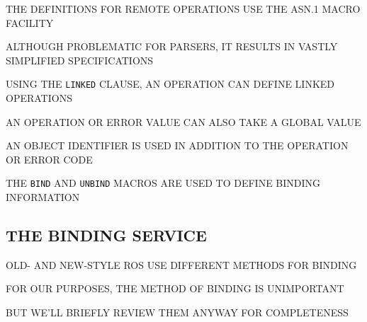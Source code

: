\begin{bwslide}

\begin{nrtc}
\item	THE DEFINITIONS FOR REMOTE OPERATIONS USE THE ASN.1 MACRO FACILITY

\item	ALTHOUGH PROBLEMATIC FOR PARSERS, IT RESULTS IN VASTLY SIMPLIFIED
	SPECIFICATIONS
\end{nrtc}
\end{bwslide}




\begin{bwslide}

\begin{nrtc}
\item	USING THE \verb"LINKED" CLAUSE, AN OPERATION CAN DEFINE LINKED
	OPERATIONS

\item	AN OPERATION OR ERROR VALUE CAN ALSO TAKE A GLOBAL VALUE
    \begin{nrtc}
    \item	AN OBJECT IDENTIFIER IS USED IN ADDITION TO THE
		OPERATION OR ERROR CODE    
    \end{nrtc}

\item	THE \verb"BIND" AND \verb"UNBIND" MACROS ARE USED TO DEFINE BINDING
	INFORMATION
\end{nrtc}
\end{bwslide}


\begin{bwslide}
\part*	{THE BINDING SERVICE}\bf

\begin{nrtc}
\item	OLD- AND NEW-STYLE ROS USE DIFFERENT METHODS FOR BINDING

\item	FOR OUR PURPOSES, THE METHOD OF BINDING IS UNIMPORTANT

\item	BUT WE'LL BRIEFLY REVIEW THEM ANYWAY FOR COMPLETENESS
\end{nrtc}
\end{bwslide}


